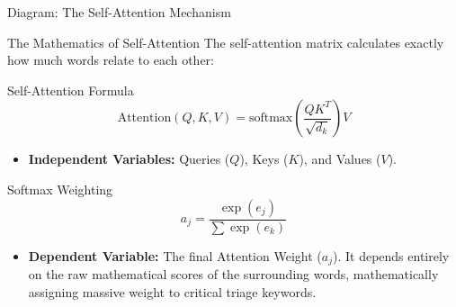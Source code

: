 \documentclass[10pt,aspectratio=169]{beamer}
\begin{document}
\begin{frame}{Diagram: The Self-Attention Mechanism}
\begin{center}
{
			}
		\end{center}
	\end{frame}
	
	\begin{frame}{The Mathematics of Self-Attention}
		The self-attention matrix calculates exactly how much words relate to each other:
		
		\begin{block}{Self-Attention Formula}
			\[ \text{Attention}(Q,K,V) = \text{softmax}\left(\frac{QK^T}{\sqrt{d_k}}\right)V \]
		\end{block}
		\begin{itemize}
			\item \textbf{Independent Variables:} Queries ($Q$), Keys ($K$), and Values ($V$).
		\end{itemize}
		\vspace{0.2cm}
		\begin{block}{Softmax Weighting}
			\[ a_j = \frac{\exp(e_j)}{\sum \exp(e_k)} \]
		\end{block}
		\begin{itemize}
			\item \textbf{Dependent Variable:} The final Attention Weight ($a_j$). It depends entirely on the raw mathematical scores of the surrounding words, mathematically assigning massive weight to critical triage keywords.
		\end{itemize}
	\end{frame}
	
\end{document}

